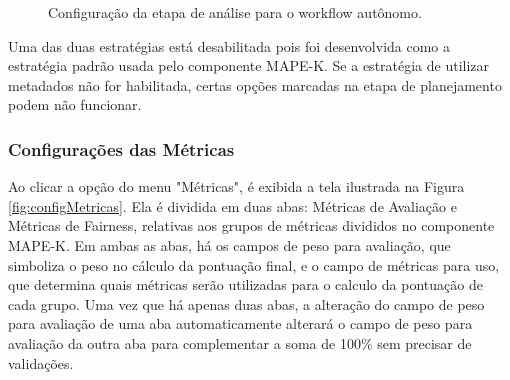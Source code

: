 \documentclass[portugues]{ic-tese}
\begin{document}
\begin{figure}[H]
    \centering
    \caption{Configuração da etapa de análise para o workflow autônomo.}
    \label{fig:configAnalise}
\end{figure}

Uma das duas estratégias está desabilitada pois foi desenvolvida como a estratégia padrão usada pelo componente MAPE-K. Se a estratégia de utilizar metadados não for habilitada, certas opções marcadas na etapa de planejamento podem não funcionar.

\subsubsection{Configurações das Métricas}

Ao clicar a opção do menu "Métricas", é exibida a tela ilustrada na Figura \ref{fig:configMetricas}. Ela é dividida em duas abas: Métricas de Avaliação e Métricas de Fairness, relativas aos grupos de métricas divididos no componente MAPE-K. Em ambas as abas, há os campos de peso para avaliação, que simboliza o peso no cálculo da pontuação final, e o campo de métricas para uso, que determina quais métricas serão utilizadas para o calculo da pontuação de cada grupo. Uma vez que há apenas duas abas, a alteração do campo de peso para avaliação de uma aba automaticamente alterará o campo de peso para avaliação da outra aba para complementar a soma de 100\% sem precisar de validações.
\end{document}
